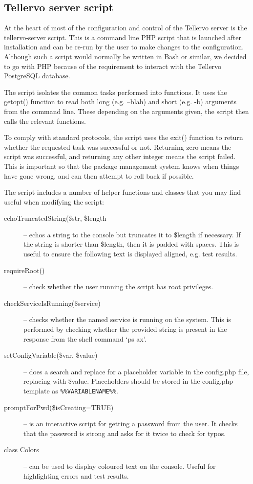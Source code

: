 \subsection{Tellervo server script}
\label{txt:tellervo-server-script}

At the heart of most of the configuration and control of the Tellervo server is the tellervo-server script.  This is a command line PHP script that is launched after installation and can be re-run by the user to make changes to the configuration.  Although such a script would normally be written in Bash or similar, we decided to go with PHP because of the requirement to interact with the Tellervo PostgreSQL database.  

The script isolates the common tasks performed into functions.  It uses the getopt() function to read both long (e.g. --blah) and short (e.g. -b) arguments from the command line.  These depending on the arguments given, the script then calls the relevant functions.

To comply with standard protocols, the script uses the exit() function to return whether the requested task was successful or not.  Returning zero means the script was successful, and returning any other integer means the script failed.  This is important so that the package management system knows when things have gone wrong, and can then attempt to roll back if possible.

The script includes a number of helper functions and classes that you may find useful when modifying the script:

\begin{description}
 \item[echoTruncatedString(\$str, \$length] -- echos a string to the console but truncates it to \$length if necessary.  If the string is shorter than \$length, then it is padded with spaces.  This is useful to ensure the following text is displayed aligned, e.g. test results.
 \item[requireRoot()] -- check whether the user running the script has root privileges.
 \item[checkServiceIsRunning(\$service)] -- checks whether the named service is running on the system.  This is performed by checking whether the provided string is present in the response from the shell command `ps ax'.
 \item[setConfigVariable(\$var, \$value)] -- does a search and replace for a placeholder variable in the config.php file, replacing with \$value.  Placeholders should be stored in the config.php template as \verb|%%VARIABLENAME%%|.
 \item[promptForPwd(\$isCreating=TRUE)] -- is an interactive script for getting a password from the user.  It checks that the password
 is strong and asks for it twice to check for typos. 
 \item[class Colors] -- can be used to display coloured text on the console.  Useful for highlighting errors and test results.

\end{description}

